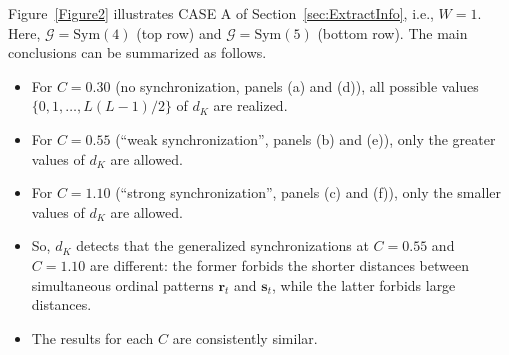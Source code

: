\documentclass{article}
\begin{document}
Figure~\ref{Figure2} illustrates CASE A of Section~\ref{sec:ExtractInfo},
i.e., $W=1$. Here, $\mathcal{G}=\mathrm{Sym}(4)$ (top row) and $\mathcal{G}=%
\mathrm{Sym}(5)$ (bottom row). The main conclusions can be summarized as
follows.

\begin{itemize}
\item For $C=0.30$ (no synchronization, panels (a) and (d)), all possible
values $\{0,1,\ldots,L(L-1)/2\}$ of $d_{K}$ are realized.

\item For $C=0.55$ (``weak synchronization'', panels (b) and (e)), only the greater values of $d_{K}$ are allowed.

\item For $C=1.10$ (``strong
synchronization'', panels (c) and (f)), only the smaller
values of $d_{K}$ are allowed.

\item So, $d_{K}$ detects that the generalized synchronizations at $C=0.55$
and $C=1.10$ are different: the former forbids the shorter distances between
simultaneous ordinal patterns $\mathbf{r}_{t}$ and $\mathbf{s}_{t}$, while
the latter forbids large distances.

\item The results for each $C$ are consistently similar.
\end{itemize}
\end{document}
